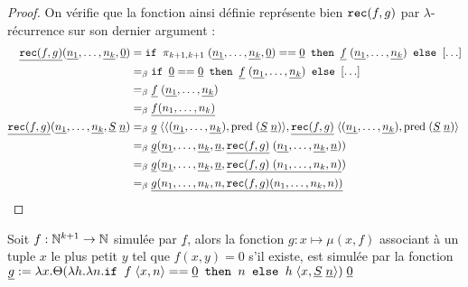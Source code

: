 \begin{proof}
    On vérifie que la fonction ainsi définie représente bien $\texttt{rec}(f,g)$ par $\lambda$-récurrence sur son dernier argument :
    \begin{align*}
        \underline{\texttt{rec}(f,g)}(\underline{n_1},\ldots,\underline{n_k},\underline 0) &= \texttt{if } \pi_{k+1,k+1}\;(\underline{n_1},\ldots,\underline{n_k},\underline 0) == \underline 0 \texttt{ then } \underline f\;(\underline{n_1},\ldots,\underline{n_k})\texttt{ else }[\ldots]\\
        &=_\beta \texttt{if } \underline 0 == \underline 0 \texttt{ then } \underline f\;(\underline{n_1},\ldots,\underline{n_k})\texttt{ else }[\ldots]\\
        &=_\beta \underline f\;(\underline{n_1},\ldots,\underline{n_k})\\
        &=_\beta \underline{f(n_1,\ldots,n_k)}\\
        \underline{\texttt{rec}(f,g)}(\underline{n_1},\ldots,\underline{n_k},\underline S\;\underline n) &=_\beta \underline g\;\langle \langle(\underline{n_1},\ldots,\underline{n_k}),\mathrm{pred}\;(\underline S\;\underline n)\rangle,\underline{\texttt{rec}(f,g)}\;\langle(\underline{n_1},\ldots,\underline{n_k}),\mathrm{pred}\;(\underline S\;\underline n)\rangle\\
        &=_\beta \underline g(\underline{n_1},\ldots,\underline{n_k},\underline n,\underline{\texttt{rec}(f,g)}\;(\underline{n_1},\ldots,\underline{n_k},\underline n))\\
        &=_\beta \underline g(\underline{n_1},\ldots,\underline{n_k},\underline n,\underline{\texttt{rec}(f,g)\;(n_1,\ldots,n_k,n)})\\
        &=_\beta \underline {g(n_1,\ldots,n_k,n,\texttt{rec}(f,g)(n_1,\ldots,n_k,n))}
    \end{align*}
\end{proof}

\begin{prop}[Schéma $\mu$]
    Soit $f : \mathbb{N}^{k+1}\to\mathbb{N}$ simulée par $\underline f$, alors la fonction $g : x\mapsto \mu(x,f)$ associant à un tuple $x$ le plus petit $y$ tel que $f(x,y) = 0$ s'il existe, est simulée par la fonction $\underline g := \lambda x.\Theta(\lambda h.\lambda n.\texttt{if } f\;\langle x,n \rangle == \underline 0 \texttt{ then } n\texttt{ else }h\;\langle x,\underline S\;\underline n \rangle)\;\underline 0$
\end{prop}

